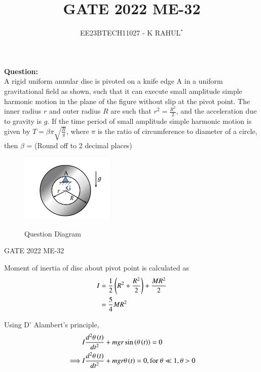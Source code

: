 \documentclass[journal,12pt,twocolumn]{IEEEtran}
\theoremstyle{remark}
\begin{document}

\vspace{3cm}
\title{GATE 2022 ME-32}
\author{EE23BTECH11027 - K RAHUL$^{*}$%
}
\maketitle
\newpage
\bigskip
\renewcommand{\thefigure}{\theenumi}
\renewcommand{\thetable}{\theenumi}
\textbf{Question:}\\
A rigid uniform annular disc is pivoted on a knife edge A in a uniform gravitational
field as shown, such that it can execute small amplitude simple harmonic motion in
the plane of the figure without slip at the pivot point. The inner radius $r$ and outer
radius $R$ are such that $r^2 = \frac{R^2}{2}$, and the acceleration due to gravity is $g$. If the
time period of small amplitude simple harmonic motion is given by $T = \beta \pi \sqrt{\frac{R}{g}}$,
where $\pi$ is the ratio of circumference to diameter of a circle, then $\beta$ =  (Round off to 2 decimal places)
\begin{figure}[h]
    \includegraphics[width=0.4\textwidth]{figs/11027_GATE_ME_32.png}\label{11027_GATE_ME_32}
    \caption{Question Diagram}
\end{figure}
\hfill{GATE 2022 ME-32}
\\
\bigskip \bigskip


\solution
\begin{table}[ht]

\end{table}


Moment of inertia of disc about pivot point is calculated as
\begin{align}
	I &= \frac{1}{2}\left(R^2 + \frac{R^2}{2}\right) + \frac{MR^2}{2} \\
	&= \frac{5}{4}MR^2 \label{11027_Moment_Of_Inertia}
\end{align}

Using D' Alambert's principle,
\begin{align}
	&I\frac{d^2\theta \left(t\right)}{dt^2} + mgr\sin\left(\theta \left(t\right)\right) = 0\\
	\implies& I\frac{d^2\theta \left(t\right)}{dt^2} + mgr\theta \left(t\right)= 0,\text{for } \theta \ll 1, \theta > 0 \label{11027_dAlambert_principle}
\end{align}
\end{document}
